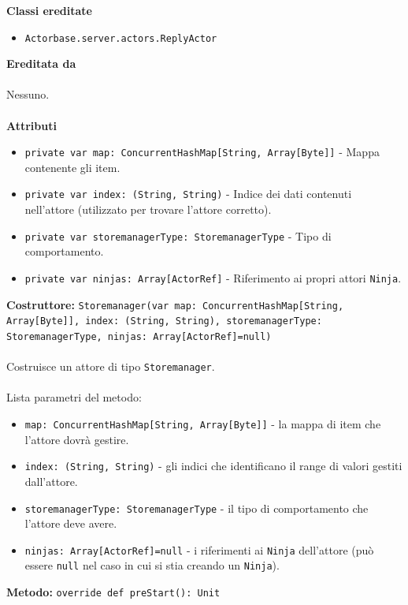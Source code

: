 \documentclass[a4paper]{article}
\begin{document}
		\textbf{Classi ereditate}
			\begin{itemize}
				\item \texttt{Actorbase.server.actors.ReplyActor}
			\end{itemize}
		\textbf{Ereditata da}
			\\ \\
			Nessuno.
			\\ \\
		\textbf{Attributi}
			\begin{itemize}
				\item \texttt{private var map: ConcurrentHashMap[String,  Array[Byte]]} - Mappa contenente gli item. 
				\item \texttt{private var index: (String, String)} - Indice dei dati contenuti nell'attore (utilizzato per trovare l'attore corretto).
				\item \texttt{private var storemanagerType: StoremanagerType} - Tipo di comportamento.
				\item \texttt{private var ninjas: Array[ActorRef]} - Riferimento ai propri attori \texttt{Ninja}.
			\end{itemize}
		\textbf{Costruttore: }\texttt{Storemanager(var map: ConcurrentHashMap[String,  Array[Byte]], index: (String, String), storemanagerType: StoremanagerType, ninjas: Array[ActorRef]=null)}
			\\ \\
			Costruisce un attore di tipo \texttt{Storemanager}.
			\\ \\
			Lista parametri del metodo:
			\begin{itemize}
				\item \texttt{map: ConcurrentHashMap[String,  Array[Byte]]} - la mappa di item che l'attore dovrà gestire.
				\item \texttt{index: (String, String)} - gli indici che identificano il range di valori gestiti dall'attore.
				\item \texttt{storemanagerType: StoremanagerType} - il tipo di comportamento che l'attore deve avere.
				\item \texttt{ninjas: Array[ActorRef]=null} - i riferimenti ai \texttt{Ninja} dell'attore (può essere \texttt{null} nel caso in cui si stia creando un \texttt{Ninja}).
			\end{itemize}
		\textbf{Metodo: }\texttt{override def preStart(): Unit}
			\\ \\
\end{document}
